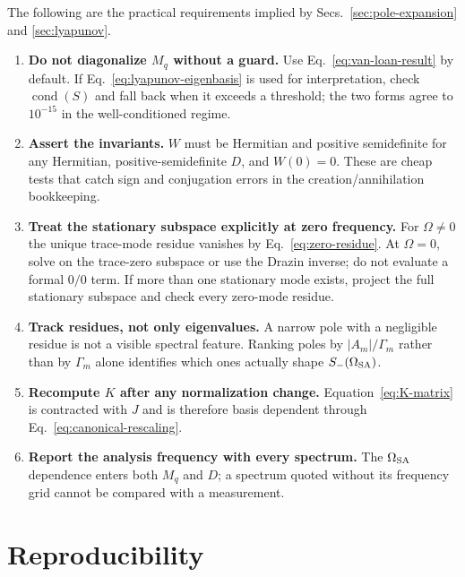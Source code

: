 \documentclass[11pt,a4paper]{article}
\begin{document}
The following are the practical requirements implied by
Secs.~\ref{sec:pole-expansion} and \ref{sec:lyapunov}.

\begin{enumerate}
\item \textbf{Do not diagonalize $M_q$ without a guard.} Use
Eq.~\eqref{eq:van-loan-result} by default. If
Eq.~\eqref{eq:lyapunov-eigenbasis} is used for interpretation, check
$\operatorname{cond}(S)$ and fall back when it exceeds a threshold; the two
forms agree to $10^{-15}$ in the well-conditioned regime.
\item \textbf{Assert the invariants.} $W$ must be Hermitian and positive
semidefinite for any Hermitian, positive-semidefinite $D$, and $W(0)=0$. These
are cheap tests that catch sign and conjugation errors in the
creation/annihilation bookkeeping.
\item \textbf{Treat the stationary subspace explicitly at zero frequency.}
For $\Omega\ne0$ the unique trace-mode residue vanishes by
Eq.~\eqref{eq:zero-residue}. At $\Omega=0$, solve on the trace-zero subspace or
use the Drazin inverse; do not evaluate a formal $0/0$ term. If more than one
stationary mode exists, project the full stationary subspace and check every
zero-mode residue.
\item \textbf{Track residues, not only eigenvalues.} A narrow pole with a
negligible residue is not a visible spectral feature. Ranking poles by
$|A_m|/\Gamma_m$ rather than by $\Gamma_m$ alone identifies which ones
actually shape $S_-(\Omega_{\rm SA})$.
\item \textbf{Recompute $K$ after any normalization change.}
Equation~\eqref{eq:K-matrix} is contracted with $J$ and is therefore
basis dependent through Eq.~\eqref{eq:canonical-rescaling}.
\item \textbf{Report the analysis frequency with every spectrum.} The
$\Omega_{\rm SA}$ dependence enters both $M_q$ and $D$; a spectrum quoted
without its frequency grid cannot be compared with a measurement.
\end{enumerate}

\section{Reproducibility}
\label{app:reproducibility}
\end{document}
